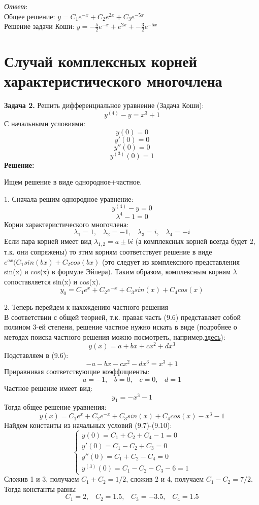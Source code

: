 \documentclass[10pt]{report}
\begin{document}
\textit{Ответ}:\\
Общее решение: $y=C_1e^{-x}+C_2e^{2x}+C_3e^{-5x}$\\
Решение задачи Коши: $y=-\frac 5 2 e^{-x}+e^{2x}+-\frac 3 2 e^{-5x}$\\
\section {Случай комплексных корней характеристического многочлена}
\textbf{Задача 2.} Решить дифференциальное уравнение (Задача Коши): 
\begin{equation}
y^{(4)}-y=x^3+1
\end{equation}
С начальными условиями:
\begin{equation}
y(0)=0
\end{equation}
\begin{equation}
y'(0)=0
\end{equation}
\begin{equation}
y''(0)=0
\end{equation}
\begin{equation}
y^{(3)}(0)=1
\end{equation}
\textbf{Решение:} \par

Ищем решение в виде однородное+частное.

1. Сначала решим однородное уравнение:
\[y^{(4)}-y=0\]
\[\lambda^4-1=0\]
Корни характеристического многочлена:
\[\lambda_1 = 1, \; \; \; \lambda_2 = -1, \; \; \; \lambda_3 = i, \; \; \; \lambda_4 = -i\]
Если пара корней имеет вид $ \lambda_{1,2} = a\pm bi$ (а комплексных корней всегда будет 2, т.к. они сопряжены) то этим корням соответствует решение в виде $e^{ax}(C_1sin(bx)+C_2cos(bx)$  (это следует из комплексного представления sin(x) и cos(x) в формуле Эйлера). Таким образом, комплексным корням $\lambda$ сопоставляется sin(x) и cos(x). 
\[y_{0}=C_1e^x+C_2e^{-x}+C_3sin(x)+C_4cos(x) \]

2. Теперь перейдем к нахождению частного решения\\
В соответствии с общей теорией, т.к. правая часть (9.6) представляет собой полином 3-ей степени, решение частное нужно искать в виде (подробнее о методах поиска частного решения можно посмотреть, например,\href{http://mathprofi.ru/kak_podobrat_chastnoe_reshenie_dy.pdf}{здесь}):
\[y(x)=a+bx+cx^2+dx^3\]
Подставляем в (9.6):
\[-a-bx-cx^2-dx^3 = x^3+1\]
Приравнивая соответствующие коэффициенты:
\[ a = -1, \;\;\; b=0, \;\;\; c = 0, \;\;\; d=1\]
Частное решение имеет вид:
\[y_1=-x^3-1\]
Тогда общее решение уравнения:
\[y(x)=C_1e^x+C_2e^{-x}+C_3sin(x)+C_4cos(x)-x^3-1\]
Найдем константы из начальных условий (9.7)-(9.10):
\[
\left\{
\begin{array}{lr}
y(0)=C_1+C_2+C_4-1=0\\
y'(0)=C_1-C_2+C_3=0\\
y''(0)=C_1+C_2-C_4=0\\
y^{(3)}(0)=C_1-C_2-C_3-6=1
\end{array}
\right.\]
Сложив 1 и 3, получаем $C_1+C_2=1/2$, сложив 2 и 4, получаем $ C_1-C_2=7/2$. Тогда константы равны
\[C_1=2, \;\;\; C_2=1.5, \;\;\; C_3 = -3.5, \;\;\; C_4 = 1.5\]
\end{document}
